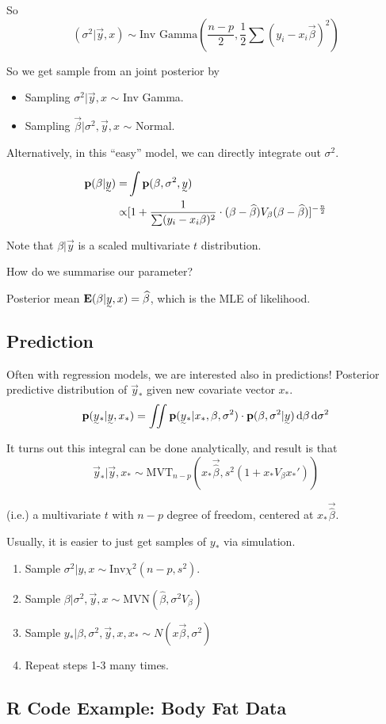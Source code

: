 So 
\[
(\sigma^2| \vec{y}, x) \sim \text{Inv Gamma}(\frac{n-p}{2}, \frac{1}{2} \sum(y_i - x_i\vec{\beta})^2)
\]

So we get sample from an joint posterior by 
\begin{itemize}
    \item Sampling $\sigma^2| \vec{y}, x$ $\sim$ Inv Gamma.
    \item Sampling $\vec{\beta}| \sigma^2, \vec{y}, x$ $\sim$ Normal.
\end{itemize}

Alternatively, in this ``easy'' model, we can directly integrate out $\sigma^2$.

\begin{align*}
    \p(\beta| \vec{y})
    =& 
    \int \p(\beta, \sigma^2, \vec{y})\\
    \propto&
    [1 + \frac{1}{\sum (y_i - x_i\beta)^2} \cdot (\beta - \hat \beta)V_\beta(\beta-\hat{\beta}) ]^{-\frac{n}{2}}
\end{align*}

Note that $\beta| \vec{y}$ is a scaled multivariate $t$ distribution.

How do we summarise our parameter?

Posterior mean $\E(\beta|\vec{y}, x) = \hat{\beta}$, which is the MLE of likelihood.

\subsection{Prediction}

Often with regression models, we are interested also in predictions! Posterior predictive distribution of $\vec{y}_{*}$ given new covariate vector $x_*$.
\[
\p(\vec{y}_*|\vec{y}, x_*) = \iint \p(\vec{y}_*| x_*, \beta, \sigma^2) \cdot \p(\beta, \sigma^2| \vec{y}) \diff \beta \diff \sigma^2
\]

It turns out this integral can be done analytically, and result is that 
\[
\vec{y}_*| \vec{y}, x_* \sim \text{MVT}_{n-p}(x_* \vec{\hat{\beta}}, s^2(1+x_*V_\beta x_*'))
\]

(i.e.) a multivariate $t$ with $n-p$ degree of freedom, centered at $x_* \vec{\hat{\beta}}$.

Usually, it is easier to just get samples of $y_*$ via simulation.

\begin{enumerate}
    \item Sample $\sigma^2| y, x \sim \text{Inv}\chi^2(n-p, s^2)$.
    \item Sample $\beta| \sigma^2, \vec{y}, x \sim \text{MVN}(\hat \beta, \sigma^2 V_\beta)$
    \item Sample $y_*| \beta, \sigma^2, \vec{y}, x, x_* \sim N(x\vec{\beta}, \sigma^2)$
    \item Repeat steps 1-3 many times.
\end{enumerate}

\subsection{R Code Example: Body Fat Data}